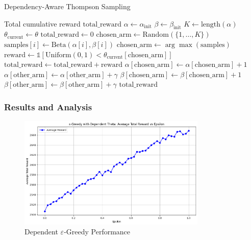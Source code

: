 \documentclass[11pt]{article}
\begin{document}
\begin{algorithm}[H]
\caption{Dependency-Aware Thompson Sampling}
\label{alg:DA-TS}
\begin{algorithmic}[1]
\Ensure Total cumulative reward $\text{total\_reward}$
\State $\alpha \gets \alpha_{\text{init}}$
\State $\beta \gets \beta_{\text{init}}$
\State $K \gets \text{length}(\alpha)$
\State $\theta_{\text{current}} \gets \theta$
\State $\text{total\_reward} \gets 0$
        \State $\text{chosen\_arm} \gets \text{Random}(\{1,\ldots,K\})$
    \Else
            \State $\text{samples}[i] \gets \text{Beta}(\alpha[i], \beta[i])$
        \EndFor
        \State $\text{chosen\_arm} \gets \arg\max(\text{samples})$
    \EndIf
    \State $\text{reward} \gets \mathbb{1}[\text{Uniform}(0,1) < \theta_{\text{current}}[\text{chosen\_arm}]]$
    \State $\text{total\_reward} \gets \text{total\_reward} + \text{reward}$
        \State $\alpha[\text{chosen\_arm}] \gets \alpha[\text{chosen\_arm}] + 1$
            \State $\alpha[\text{other\_arm}] \gets \alpha[\text{other\_arm}] + \gamma$
        \EndFor
    \Else
        \State $\beta[\text{chosen\_arm}] \gets \beta[\text{chosen\_arm}] + 1$
            \State $\beta[\text{other\_arm}] \gets \beta[\text{other\_arm}] + \gamma$
        \EndFor
    \EndIf
\EndFor
\State \Return $\text{total\_reward}$
\end{algorithmic}
\end{algorithm}



\newpage
\subsubsection*{Results and Analysis}
\begin{figure}[H]
    \centering
    \includegraphics[width=0.8\textwidth]{pics/greedy_dependence.png}
    \caption{Dependent \(\varepsilon\)-Greedy Performance}
    \label{fig:greedy_dependence}
\end{figure}
\end{document}
